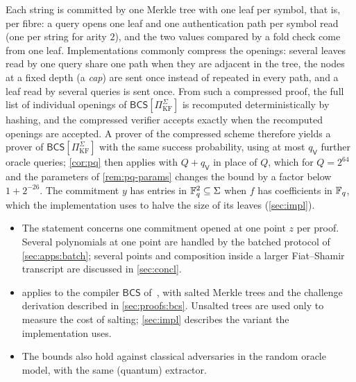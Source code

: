 \begin{remark}\label{rem:layout}
Each string is committed by one Merkle tree with one leaf per symbol, that is, per fibre: a query opens one leaf and one authentication path per symbol read (one per string for arity $2$), and the two values compared by a fold check come from one leaf.
Implementations commonly compress the openings: several leaves read by one query share one path when they are adjacent in the tree, the nodes at a fixed depth (a \emph{cap}) are sent once instead of repeated in every path, and a leaf read by several queries is sent once. From such a compressed proof, the full list of individual openings of $\mathsf{BCS}[\Pi^\Sigma_{\mathrm{KF}}]$ is recomputed deterministically by hashing, and the compressed verifier accepts exactly when the recomputed openings are accepted. A prover of the compressed scheme therefore yields a prover of $\mathsf{BCS}[\Pi^\Sigma_{\mathrm{KF}}]$ with the same success probability, using at most $q_{\mathsf{V}}$ further oracle queries; \cref{cor:pq} then applies with $Q + q_{\mathsf{V}}$ in place of $Q$, which for $Q = 2^{64}$ and the parameters of \cref{rem:pq-params} changes the bound by a factor below $1 + 2^{-26}$.
The commitment $y$ has entries in $\mathbb{F}_q^2 \subseteq \Sigma$ when $f$ has coefficients in $\mathbb{F}_q$, which the implementation uses to halve the size of its leaves (\cref{sec:impl}).
\end{remark}

\begin{remark}[Scope]\label{rem:scope}
\begin{itemize}
  \item The statement concerns one commitment opened at one point $z$ per proof. Several polynomials at one point are handled by the batched protocol of \cref{sec:apps:batch}; several points and composition inside a larger Fiat--Shamir transcript are discussed in \cref{sec:concl}.
  \item {} applies to the compiler $\mathsf{BCS}$ of~\cite[Construction~11.7]{CDHZ25}, with salted Merkle trees and the challenge derivation described in \cref{sec:proofs:bcs}. Unsalted trees are used only to measure the cost of salting; \cref{sec:impl} describes the variant the implementation uses.
  \item The bounds also hold against classical adversaries in the random oracle model, with the same (quantum) extractor.
\end{itemize}
\end{remark}
